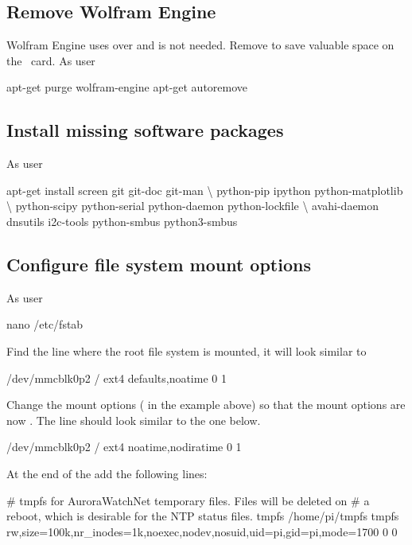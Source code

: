 \subsection{Remove Wolfram Engine}
Wolfram Engine uses over  and is not needed. Remove to save
valuable space on the \sd\ card. As user \rootUser
\begin{Cmd}
apt-get purge wolfram-engine
apt-get autoremove
\end{Cmd}


\subsection{Install missing software packages}
As user \rootUser
\begin{Cmd}
apt-get install screen git git-doc git-man \textbackslash
    python-pip ipython python-matplotlib \textbackslash
    python-scipy python-serial python-daemon python-lockfile \textbackslash
    avahi-daemon dnsutils i2c-tools python-smbus python3-smbus
\end{Cmd}

\subsection{Configure file system mount options}

As user \rootUser
\begin{Cmd}
nano /etc/fstab  
\end{Cmd}

Find the line where the root file system is mounted, it will look
similar to
\begin{Cmd}
/dev/mmcblk0p2  /               ext4    defaults,noatime  0       1
\end{Cmd}
Change the mount options ( in the example
above) so that the mount options are now
. The line should look similar to the one
below.
\begin{Cmd}
/dev/mmcblk0p2  /               ext4    noatime,nodiratime  0       1
\end{Cmd}

At the end of the  add the following lines:
\begin{Cmd}[fontsize=\relsize{-2.5}]
# tmpfs for AuroraWatchNet temporary files. Files will be deleted on 
# a reboot, which is desirable for the NTP status files.
tmpfs  /home/pi/tmpfs  tmpfs  rw,size=100k,nr_inodes=1k,noexec,nodev,nosuid,uid=pi,gid=pi,mode=1700  0  0
\end{Cmd}

